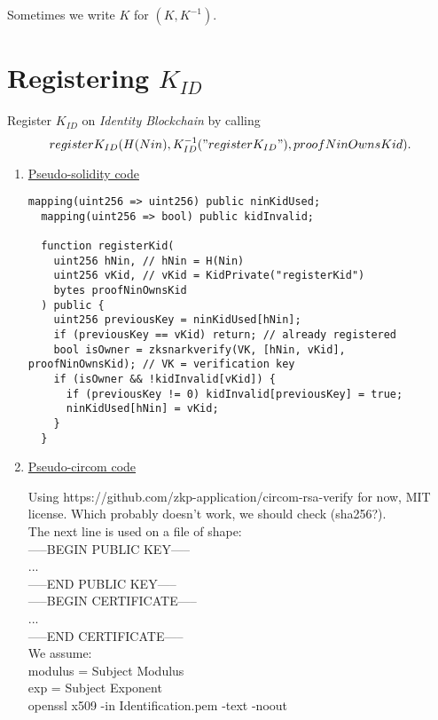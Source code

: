 \documentclass{article}
\newcommand{\kid}{K_{ID}}
\newcommand{\pbc}{\textit{Identity Blockchain}}
\begin{document}
Sometimes we write $K$ for $(K, K^{-1})$.

\newpage
\section{Registering $\kid$}
Register $\kid$ on \pbc{} by calling $$register\kid(H(Nin), \kid^{-1}("register\kid"), proofNinOwnsKid).$$
\begin{enumerate}[leftmargin=0cm]
\item[] \underline{Pseudo-solidity code}

\hfill\begin{minipage}{\dimexpr\textwidth-20px}
\begin{lstlisting}[language=Solidity]
  mapping(uint256 => uint256) public ninKidUsed;
  mapping(uint256 => bool) public kidInvalid;

  function registerKid(
    uint256 hNin, // hNin = H(Nin)
    uint256 vKid, // vKid = KidPrivate("registerKid")
    bytes proofNinOwnsKid
  ) public {
    uint256 previousKey = ninKidUsed[hNin];
    if (previousKey == vKid) return; // already registered
    bool isOwner = zksnarkverify(VK, [hNin, vKid], proofNinOwnsKid); // VK = verification key
    if (isOwner && !kidInvalid[vKid]) {
      if (previousKey != 0) kidInvalid[previousKey] = true;
      ninKidUsed[hNin] = vKid;
    }
  }
\end{lstlisting}
\xdef\tpd{\the\prevdepth}
\end{minipage}

\item[] \underline{Pseudo-circom code}

Using https://github.com/zkp-application/circom-rsa-verify for now, MIT license.
Which probably doesn't work, we should check (sha256?). \\
The next line is used on a file of shape:\\
-----BEGIN PUBLIC KEY-----\\
...\\
-----END PUBLIC KEY-----\\
-----BEGIN CERTIFICATE-----\\
...\\
-----END CERTIFICATE-----\\
We assume: \\
	modulus = Subject Modulus\\
	exp = Subject Exponent\\
openssl x509 -in Identification.pem -text -noout\\


\end{enumerate}
\end{document}
